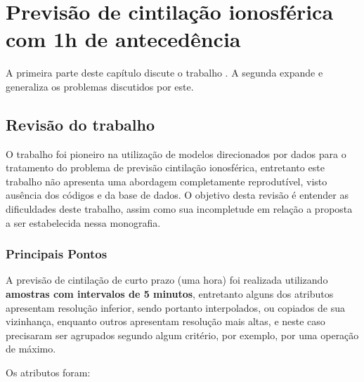 \chapter{Previsão de cintilação ionosférica com 1h de antecedência}\label{ch:revisonrezende}

A primeira parte deste capítulo discute o trabalho \cite{REZENDE:2009}. A segunda expande e generaliza os problemas discutidos por este.

\section{Revisão do trabalho \cite{REZENDE:2009}}

O trabalho \cite{REZENDE:2009} foi pioneiro na utilização de modelos direcionados por dados para o tratamento do problema de previsão cintilação ionosférica, entretanto este trabalho não apresenta uma abordagem completamente reprodutível, visto ausência dos códigos e da base de dados. O objetivo desta revisão é entender as dificuldades deste trabalho, assim como sua incompletude em relação a proposta a ser estabelecida nessa monografia.

\subsection{Principais Pontos}

A previsão de cintilação de curto prazo (uma hora) foi realizada utilizando {\bf amostras com intervalos de 5 minutos}, entretanto alguns dos atributos apresentam resolução inferior, sendo portanto interpolados, ou copiados de sua vizinhança, enquanto outros apresentam resolução mais altas, e neste caso precisaram ser agrupados segundo algum critério, por exemplo, por uma operação de máximo.

Os atributos foram:

